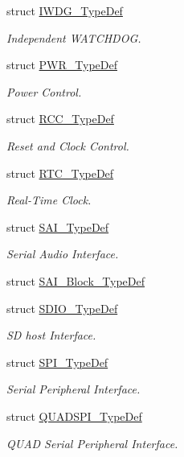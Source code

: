 \begin{DoxyCompactItemize}
struct \hyperlink{struct_i_w_d_g___type_def}{I\+W\+D\+G\+\_\+\+Type\+Def}
\begin{DoxyCompactList}\small\item\em Independent W\+A\+T\+C\+H\+D\+OG. \end{DoxyCompactList}\item 
struct \hyperlink{struct_p_w_r___type_def}{P\+W\+R\+\_\+\+Type\+Def}
\begin{DoxyCompactList}\small\item\em Power Control. \end{DoxyCompactList}\item 
struct \hyperlink{struct_r_c_c___type_def}{R\+C\+C\+\_\+\+Type\+Def}
\begin{DoxyCompactList}\small\item\em Reset and Clock Control. \end{DoxyCompactList}\item 
struct \hyperlink{struct_r_t_c___type_def}{R\+T\+C\+\_\+\+Type\+Def}
\begin{DoxyCompactList}\small\item\em Real-\/\+Time Clock. \end{DoxyCompactList}\item 
struct \hyperlink{struct_s_a_i___type_def}{S\+A\+I\+\_\+\+Type\+Def}
\begin{DoxyCompactList}\small\item\em Serial Audio Interface. \end{DoxyCompactList}\item 
struct \hyperlink{struct_s_a_i___block___type_def}{S\+A\+I\+\_\+\+Block\+\_\+\+Type\+Def}
\item 
struct \hyperlink{struct_s_d_i_o___type_def}{S\+D\+I\+O\+\_\+\+Type\+Def}
\begin{DoxyCompactList}\small\item\em SD host Interface. \end{DoxyCompactList}\item 
struct \hyperlink{struct_s_p_i___type_def}{S\+P\+I\+\_\+\+Type\+Def}
\begin{DoxyCompactList}\small\item\em Serial Peripheral Interface. \end{DoxyCompactList}\item 
struct \hyperlink{struct_q_u_a_d_s_p_i___type_def}{Q\+U\+A\+D\+S\+P\+I\+\_\+\+Type\+Def}
\begin{DoxyCompactList}\small\item\em Q\+U\+AD Serial Peripheral Interface. \end{DoxyCompactList}\item 

\end{DoxyCompactItemize}
